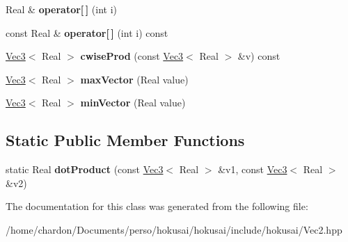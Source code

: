 \begin{DoxyCompactItemize}
\item 
\hypertarget{classVec3_a040ba7b92562feb789859e52f7dfe56d}{Real \& {\bfseries operator\mbox{[}$\,$\mbox{]}} (int i)}\label{classVec3_a040ba7b92562feb789859e52f7dfe56d}

\item 
\hypertarget{classVec3_a14a7dbb0ed32a485f84bbb1ba3ced109}{const Real \& {\bfseries operator\mbox{[}$\,$\mbox{]}} (int i) const }\label{classVec3_a14a7dbb0ed32a485f84bbb1ba3ced109}

\item 
\hypertarget{classVec3_a7176d6d1814ff1be6cfd6141839d7c52}{\hyperlink{classVec3}{Vec3}$<$ Real $>$ {\bfseries cwise\+Prod} (const \hyperlink{classVec3}{Vec3}$<$ Real $>$ \&v) const }\label{classVec3_a7176d6d1814ff1be6cfd6141839d7c52}

\item 
\hypertarget{classVec3_a29855db156fa29dfff217d5a0fe38b7a}{\hyperlink{classVec3}{Vec3}$<$ Real $>$ {\bfseries max\+Vector} (Real value)}\label{classVec3_a29855db156fa29dfff217d5a0fe38b7a}

\item 
\hypertarget{classVec3_a30d6a465af06804a82ffebc8d6840b62}{\hyperlink{classVec3}{Vec3}$<$ Real $>$ {\bfseries min\+Vector} (Real value)}\label{classVec3_a30d6a465af06804a82ffebc8d6840b62}

\end{DoxyCompactItemize}
\subsection*{Static Public Member Functions}
\begin{DoxyCompactItemize}
\item 
\hypertarget{classVec3_aee45f5624c9ee578ab7d2a9d121f7ccf}{static Real {\bfseries dot\+Product} (const \hyperlink{classVec3}{Vec3}$<$ Real $>$ \&v1, const \hyperlink{classVec3}{Vec3}$<$ Real $>$ \&v2)}\label{classVec3_aee45f5624c9ee578ab7d2a9d121f7ccf}

\end{DoxyCompactItemize}


The documentation for this class was generated from the following file\+:\begin{DoxyCompactItemize}
\item 
/home/chardon/\+Documents/perso/hokusai/hokusai/include/hokusai/Vec2.\+hpp\end{DoxyCompactItemize}
